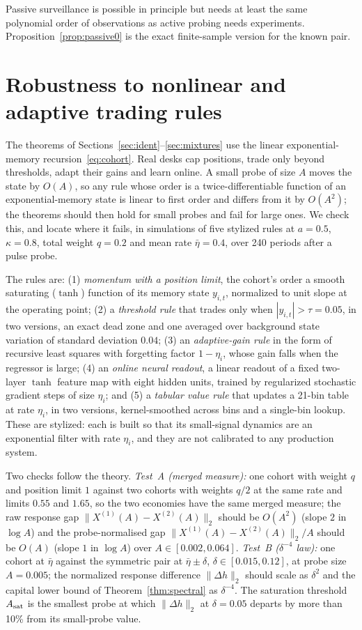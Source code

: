 Passive surveillance is possible in principle but needs at least the same polynomial order of observations as active probing needs experiments. Proposition~\ref{prop:passive0} is the exact finite-sample version for the known pair.

\section{Robustness to nonlinear and adaptive trading rules}\label{sec:learners}

The theorems of Sections~\ref{sec:ident}--\ref{sec:mixtures} use the linear exponential-memory recursion~\eqref{eq:cohort}. Real desks cap positions, trade only beyond thresholds, adapt their gains and learn online. A small probe of size $A$ moves the state by $O(A)$, so any rule whose order is a twice-differentiable function of an exponential-memory state is linear to first order and differs from it by $O(A^2)$; the theorems should then hold for small probes and fail for large ones. We check this, and locate where it fails, in simulations of five stylized rules at $a=0.5$, $\kappa=0.8$, total weight $q=0.2$ and mean rate $\bar\eta=0.4$, over 240 periods after a pulse probe.

The rules are: (1) \emph{momentum with a position limit}, the cohort's order a smooth saturating ($\tanh$) function of its memory state $y_{i,t}$, normalized to unit slope at the operating point; (2) a \emph{threshold rule} that trades only when $|y_{i,t}|>\tau=0.05$, in two versions, an exact dead zone and one averaged over background state variation of standard deviation $0.04$; (3) an \emph{adaptive-gain rule} in the form of recursive least squares with forgetting factor $1-\eta_i$, whose gain falls when the regressor is large; (4) an \emph{online neural readout}, a linear readout of a fixed two-layer $\tanh$ feature map with eight hidden units, trained by regularized stochastic gradient steps of size $\eta_i$; and (5) a \emph{tabular value rule} that updates a 21-bin table at rate $\eta_i$, in two versions, kernel-smoothed across bins and a single-bin lookup. These are stylized: each is built so that its small-signal dynamics are an exponential filter with rate $\eta_i$, and they are not calibrated to any production system.

Two checks follow the theory. \emph{Test~A (merged measure):} one cohort with weight $q$ and position limit $1$ against two cohorts with weights $q/2$ at the same rate and limits $0.55$ and $1.65$, so the two economies have the same merged measure; the raw response gap $\|X^{(1)}(A)-X^{(2)}(A)\|_2$ should be $O(A^2)$ (slope $2$ in $\log A$) and the probe-normalised gap $\|X^{(1)}(A)-X^{(2)}(A)\|_2/A$ should be $O(A)$ (slope $1$ in $\log A$) over $A\in[0.002,0.064]$. \emph{Test~B ($\delta^{-4}$ law):} one cohort at $\bar\eta$ against the symmetric pair at $\bar\eta\pm\delta$, $\delta\in[0.015,0.12]$, at probe size $A=0.005$; the normalized response difference $\|\Delta h\|_2$ should scale as $\delta^2$ and the capital lower bound of Theorem~\ref{thm:spectral} as $\delta^{-4}$. The saturation threshold $A_{\rm sat}$ is the smallest probe at which $\|\Delta h\|_2$ at $\delta=0.05$ departs by more than 10\% from its small-probe value.

